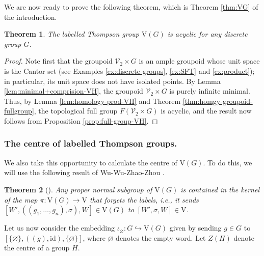 \documentclass[10pt,a4paper]{amsart}
\numberwithin{equation}{section}
\numberwithin{figure}{section}
\newtheorem{thm}{Theorem}[section]
\theoremstyle{definition}
\newcommand{\cV}{\mathcal{V}}
\newcommand{\V}{\mathrm{V}}
\begin{document}
We are now ready to prove the following theorem, which is Theorem \ref{thm:VG} of the introduction.

\begin{thm}
\label{thm:laV-acyc}
The labelled Thompson group $\V(G)$ is acyclic for any discrete group $G$.
\end{thm}
\begin{proof}
Note first that the groupoid $\mathcal{V}_2 \times G$ is an ample groupoid whose unit space is the Cantor set (see Examples \ref{ex:discrete-groups}, \ref{ex:SFT} and \ref{ex:product}); in particular, its unit space does not have isolated points. By Lemma \ref{lem:minimal+comprision-VH}, the groupoid $\cV_2\times G$ is purely infinite minimal. Thus, by Lemma \ref{lem:homology-prod-VH} and Theorem \ref{thm:homgy-groupoid-fullgroup}, the topological full group $F(\cV_2 \times G)$ is acyclic, and the result now follows from Proposition \ref{prop:full-group-VH}.
\end{proof}


\subsubsection*{The centre of labelled Thompson groups.}
We also take this opportunity to calculate the centre of $\V(G)$. To do this, we will use the following result of Wu-Wu-Zhao-Zhou \cite{WuWuZhaoZhou2025}. 

\begin{thm}[{\cite[Theorem 2.1]{WuWuZhaoZhou2025}}]
\label{thm:VG-normal-subgroup}
Any proper normal subgroup of $\V(G)$ is contained in the kernel of the map $\pi \colon \V(G) \to \V$ that forgets the labels, i.e., it sends $[W',((g_1,\ldots, g_n),\sigma), W] \in \V(G)$ to $[W',\sigma, W] \in \V$.
\end{thm}

Let us now consider the embedding $\iota_\varnothing \colon G \hookrightarrow \V(G)$ given by sending $g\in G$ to $[\{\varnothing\},((g),\mathrm{id}),\{\varnothing\}]$, where $\varnothing$ denotes the empty word. Let $Z(H)$ denote the centre of a group $H$.
\end{document}
